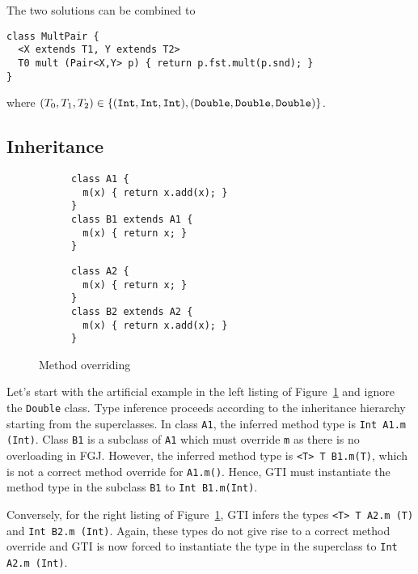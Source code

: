 The two solutions can be combined to
\begin{lstlisting}[style=fgj]
class MultPair {
  <X extends T1, Y extends T2>
  T0 mult (Pair<X,Y> p) { return p.fst.mult(p.snd); }
}
\end{lstlisting}
where
$ (T_0, T_1, T_2)  \in \{ ({\tt Int}, {\tt Int}, {\tt Int}), ({\tt Double}, {\tt Double}, {\tt Double}) \}$.

\subsection{Inheritance}
\label{sec:inheritance}

\begin{figure}[tp]
  \begin{subfigure}[t]{0.49\linewidth}
\begin{lstlisting}[style=tfgj]
class A1 {
  m(x) { return x.add(x); }
}
class B1 extends A1 {
  m(x) { return x; }
}
\end{lstlisting}
  \end{subfigure}
\begin{subfigure}[t]{0.49\linewidth}
\begin{lstlisting}[style=tfgj]
class A2 {
  m(x) { return x; }
}
class B2 extends A2 {
  m(x) { return x.add(x); }
}
\end{lstlisting}
  \end{subfigure}
  \caption{Method overriding}
  \label{fig:method-overriding}
\end{figure}

Let's start with the artificial example in the left
listing of Figure~\ref{fig:method-overriding} and ignore the \texttt{Double} class. Type
inference proceeds according 
to the inheritance hierarchy starting from the superclasses. In class
\texttt{A1}, the inferred method type is \texttt{Int A1.m (Int)}. Class \texttt{B1} is a
subclass of \texttt{A1} which must override \texttt{m} as there is no
overloading in FGJ. However, the inferred method 
type is \texttt{<T> T B1.m(T)}, which is not a correct
method override for \texttt{A1.m()}.
Hence, GTI must instantiate the method type in the subclass \texttt{B1} to
\texttt{Int B1.m(Int)}.

Conversely, for the right listing of
Figure~\ref{fig:method-overriding}, GTI infers the types
\texttt{<T> T A2.m (T)} and \texttt{Int B2.m (Int)}. Again, these
types do not give rise to a correct method override and 
GTI is now forced to instantiate the type in the superclass to
\texttt{Int A2.m (Int)}.

